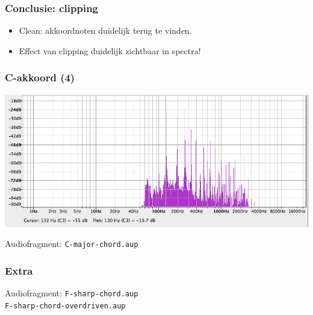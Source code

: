 \documentclass[compress, darktitle, framenumber]{beamer}
\begin{document}
\begin{frame}
\frametitle{Conclusie: clipping}
\begin{itemize}
\item Clean: akkoordnoten duidelijk terug te vinden. 
\item Effect van clipping duidelijk zichtbaar in spectra!
\end{itemize}
\end{frame}

\begin{frame}
\frametitle{C-akkoord (4)}
\includegraphics[width=\textwidth]{images/C-major-chord.png}
\begin{block}{Audiofragment:}
\texttt{C-major-chord.aup} 
\end{block}
\end{frame}


\begin{frame}
\frametitle{Extra}
\begin{block}{Audiofragment:}
\texttt{F-sharp-chord.aup} \\
\texttt{F-sharp-chord-overdriven.aup} \\
\end{block}
\end{frame}
\end{document}

